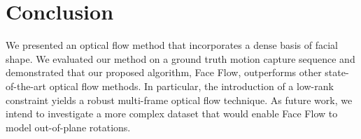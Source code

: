 \section{Conclusion}\label{sec:conclusion}
We presented an optical flow method that incorporates a dense
basis of facial shape. We evaluated our method on a ground truth motion capture
sequence and demonstrated that our proposed algorithm, Face Flow, outperforms
other state-of-the-art optical flow methods. In particular, the introduction
of a low-rank constraint yields a robust multi-frame optical flow technique.
As future work, we intend to investigate a more complex dataset that would enable
Face Flow to model out-of-plane rotations.